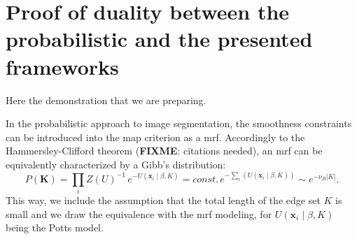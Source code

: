 
%
\onecolumn
\appendix

\section{Proof of duality between the probabilistic and the presented frameworks}
Here the demonstration that we are preparing.


In the probabilistic approach to image segmentation, the smoothness constraints
can be introduced into the \gls{map} criterion as a \gls{mrf}. Accordingly to the
Hammersley-Clifford theorem (\textbf{FIXME}: citations needed), an \gls{mrf} can
be equivalently characterized by a Gibb's distribution:
\begin{equation}
P(\mathbf{K})=\underset{i}{\prod} Z(U)^{-1}\,e^{-U(\mathbf{x}_i \mid \beta,K)} = \mathit{const.}\,e^{- \sum\limits_i \left( U(\mathbf{x}_i \mid \beta,K) \right) } \sim e^{-\nu_B \left| K \right| }.
\end{equation}
This way, we include the assumption that the total length of the edge set $K$ is small
and we draw the equivalence with the \gls{mrf} modeling, for $U(\mathbf{x}_i \mid \beta,K)$
being the Potts model.


